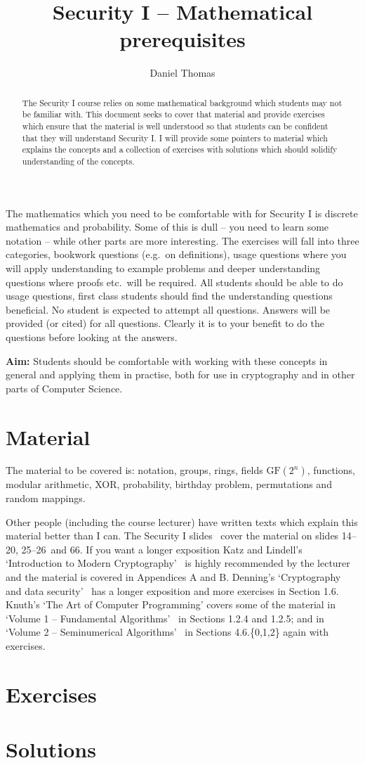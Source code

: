\documentclass[12pt,a4paper]{article}
\author{Daniel Thomas}
\title{Security I -- Mathematical prerequisites}
\newif\ifshowanswers
\newcommand{\slidesinitialmath}{14--20}
\newcommand{\slidesprobability}{25--26}
\newcommand{\slidesbirthday}{66}
\newcommand{\slidesall}{\slidesinitialmath, \slidesprobability\ and \slidesbirthday}
\begin{document}
\maketitle

\begin{abstract}
The Security I course relies on some mathematical background which students may not be familiar with.
This document seeks to cover that material and provide exercises which ensure that the material is well understood so that students can be confident that they will understand Security I.
I will provide some pointers to material which explains the concepts and a collection of exercises with solutions which should solidify understanding of the concepts.
\end{abstract}

The mathematics which you need to be comfortable with for Security I is discrete mathematics and probability.
Some of this is dull -- you need to learn some notation -- while other parts are more interesting.
The exercises will fall into three categories, bookwork questions (e.g.\ on definitions), usage questions where you will apply understanding to example problems and deeper understanding questions where proofs etc.\ will be required.
All students should be able to do usage questions, first class students should find the understanding questions beneficial.
No student is expected to attempt all questions.
Answers will be provided (or cited) for all questions.
Clearly it is to your benefit to do the questions before looking at the answers.

{\bf Aim:} Students should be comfortable with working with these concepts in general and applying them in practise, both for use in cryptography and in other parts of Computer Science.

\section*{Material}
The material to be covered is: notation, groups, rings, fields $\mathrm{GF}(2^n)$, functions, modular arithmetic, XOR, probability, birthday problem, permutations and random mappings.

Other people (including the course lecturer) have written texts which explain this material better than I can.
The Security I slides~\cite{SecurityISlides} cover the material on slides \slidesall.
If you want a longer exposition Katz and Lindell's `Introduction to Modern Cryptography'~\cite{Katz2008} is highly recommended by the lecturer and the material is covered in Appendices A and B.
Denning's `Cryptography and data security'~\cite{Denning1982} has a longer exposition and more exercises in Section 1.6.
Knuth's `The Art of Computer Programming' covers some of the material in `Volume 1 -- Fundamental Algorithms'~\cite{KnuthTAOCP1} in Sections 1.2.4 and 1.2.5; and in `Volume 2 -- Seminumerical Algorithms'~\cite{KnuthTAOCP2} in Sections 4.6.\{0,1,2\} again with exercises.

\section*{Exercises}
\showanswersfalse


\twocolumn
\section*{Solutions}
\showanswerstrue


\onecolumn

\printbibliography
\end{document}
